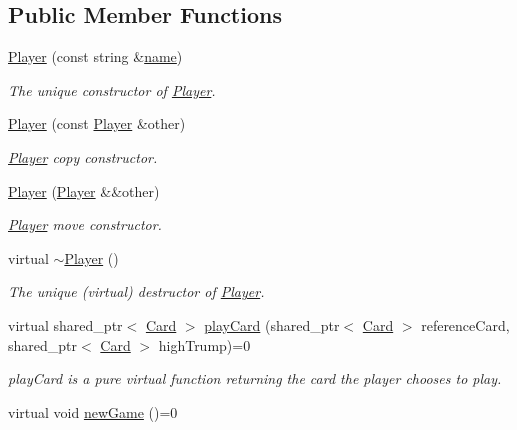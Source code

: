 \subsection*{\-Public \-Member \-Functions}
\begin{DoxyCompactItemize}
\item 
\hyperlink{classPlayer_a5a2790fccf10c30106370d910c96d317}{\-Player} (const string \&\hyperlink{classPlayer_acf0355128a99ee20ad9931b760fb2de1}{name})
\begin{DoxyCompactList}\small\item\em \-The unique constructor of \hyperlink{classPlayer}{\-Player}. \end{DoxyCompactList}\item 
\hypertarget{classPlayer_a4a8b7f689e924b15a9e6f9888983fb43}{\hyperlink{classPlayer_a4a8b7f689e924b15a9e6f9888983fb43}{\-Player} (const \hyperlink{classPlayer}{\-Player} \&other)}\label{classPlayer_a4a8b7f689e924b15a9e6f9888983fb43}

\begin{DoxyCompactList}\small\item\em \hyperlink{classPlayer}{\-Player} copy constructor. \end{DoxyCompactList}\item 
\hypertarget{classPlayer_ae3d3eb16a37c49cf91b5093632061d69}{\hyperlink{classPlayer_ae3d3eb16a37c49cf91b5093632061d69}{\-Player} (\hyperlink{classPlayer}{\-Player} \&\&other)}\label{classPlayer_ae3d3eb16a37c49cf91b5093632061d69}

\begin{DoxyCompactList}\small\item\em \hyperlink{classPlayer}{\-Player} move constructor. \end{DoxyCompactList}\item 
\hypertarget{classPlayer_a749d2c00e1fe0f5c2746f7505a58c062}{virtual \hyperlink{classPlayer_a749d2c00e1fe0f5c2746f7505a58c062}{$\sim$\-Player} ()}\label{classPlayer_a749d2c00e1fe0f5c2746f7505a58c062}

\begin{DoxyCompactList}\small\item\em \-The unique (virtual) destructor of \hyperlink{classPlayer}{\-Player}. \end{DoxyCompactList}\item 
virtual shared\-\_\-ptr$<$ \hyperlink{classCard}{\-Card} $>$ \hyperlink{classPlayer_aeba090a124bfd9a3666d2d793439cae0}{play\-Card} (shared\-\_\-ptr$<$ \hyperlink{classCard}{\-Card} $>$ reference\-Card, shared\-\_\-ptr$<$ \hyperlink{classCard}{\-Card} $>$ high\-Trump)=0
\begin{DoxyCompactList}\small\item\em play\-Card is a pure virtual function returning the card the player chooses to play. \end{DoxyCompactList}\item 
\hypertarget{classPlayer_a76a707ceb6f24b0a2a801434ee5a60ad}{virtual void \hyperlink{classPlayer_a76a707ceb6f24b0a2a801434ee5a60ad}{new\-Game} ()=0}\label{classPlayer_a76a707ceb6f24b0a2a801434ee5a60ad}


\end{DoxyCompactItemize}
